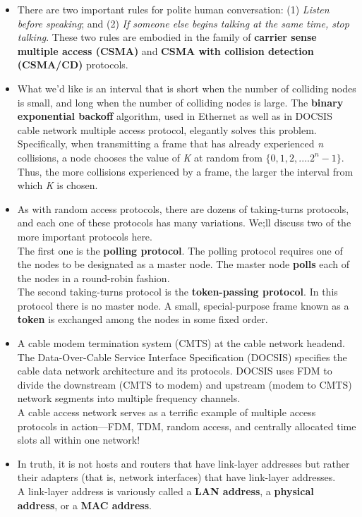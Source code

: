 \begin{itemize}
\item
There are two important rules for polite human conversation: (1) \textit{Listen before speaking}; and (2) \textit{If someone else begins talking at the same time, stop talking}. These two rules are embodied in the family of \textbf{carrier sense multiple access (CSMA)} and \textbf{CSMA with collision detection (CSMA/CD)} protocols.

\item
What we'd like is an interval that is short when the number of colliding nodes is small, and long when the number of colliding nodes is large. The \textbf{binary exponential backoff} algorithm, used in Ethernet as well as in DOCSIS cable network multiple access protocol, elegantly solves this problem. Specifically, when transmitting a frame that has already experienced \textit{n} collisions, a node chooses the value of \textit{K} at random from \(\{0,1,2,....2^n-1\}\). Thus, the more collisions experienced by a frame, the larger the interval from which \textit{K} is chosen.

\item
As with random access protocols, there are dozens of taking-turns protocols, and each one of these protocols has many variations. We;ll discuss two of the more important protocols here.\\
The first one is the \textbf{polling protocol}. The polling protocol requires one of the nodes to be designated as a master node. The master node \textbf{polls} each of the nodes in a round-robin fashion.\\
The second taking-turns protocol is the \textbf{token-passing protocol}. In this protocol there is no master node. A small, special-purpose frame known as a \textbf{token} is exchanged among the nodes in some fixed order.

\item
A cable modem termination system (CMTS) at the cable network headend. The Data-Over-Cable Service Interface Specification (DOCSIS) specifies the cable data network architecture and its protocols. DOCSIS uses FDM to divide the downstream (CMTS to modem) and upstream (modem to CMTS) network segments into multiple frequency channels.\\
A cable access network serves as a terrific example of multiple access protocols in action---FDM, TDM, random access, and centrally allocated time slots all within one network!

\item
In truth, it is not hosts and routers that have link-layer addresses but rather their adapters (that is, network interfaces) that have link-layer addresses.\\
A link-layer address is variously called a \textbf{LAN address}, a \textbf{physical address}, or a \textbf{MAC address}.


\end{itemize}
